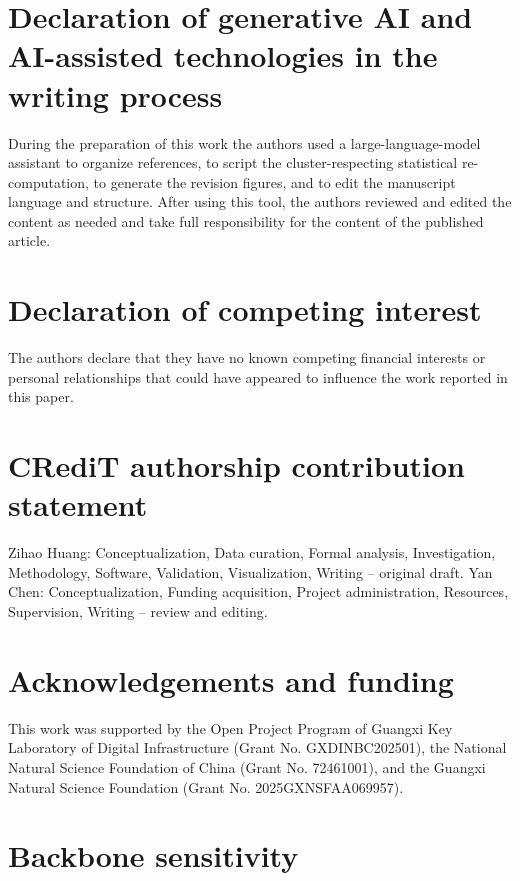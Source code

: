 \section*{Declaration of generative AI and AI-assisted technologies in the writing process}\label{ai_declaration}

During the preparation of this work the authors used a large-language-model assistant to organize references, to script the cluster-respecting statistical re-computation, to generate the revision figures, and to edit the manuscript language and structure. After using this tool, the authors reviewed and edited the content as needed and take full responsibility for the content of the published article.

\section*{Declaration of competing interest}\label{declaration_of_competing_interest}

The authors declare that they have no known competing financial interests or personal relationships that could have appeared to influence the work reported in this paper.

\section*{CRediT authorship contribution statement}\label{credit_authorship_contribution_statement}

Zihao Huang: Conceptualization, Data curation, Formal analysis, Investigation, Methodology, Software, Validation, Visualization, Writing -- original draft. Yan Chen: Conceptualization, Funding acquisition, Project administration, Resources, Supervision, Writing -- review and editing.

\section*{Acknowledgements and funding}\label{acknowledgements_and_funding}

This work was supported by the Open Project Program of Guangxi Key Laboratory of Digital Infrastructure (Grant No. GXDINBC202501), the National Natural Science Foundation of China (Grant No. 72461001), and the Guangxi Natural Science Foundation (Grant No. 2025GXNSFAA069957).

\appendix
\setcounter{table}{0}
\setcounter{figure}{0}

\section{Backbone sensitivity}\label{appendix:backbone}
\setcounter{table}{0}

